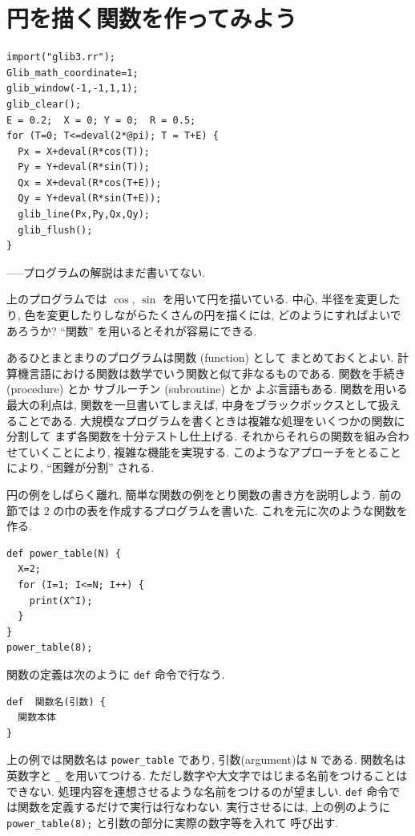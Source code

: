 \documentclass{jbook}
\begin{document}
\section{円を描く関数を作ってみよう}

\begin{screen}
\begin{verbatim}
import("glib3.rr");
Glib_math_coordinate=1;
glib_window(-1,-1,1,1);
glib_clear();
E = 0.2;  X = 0; Y = 0;  R = 0.5;
for (T=0; T<=deval(2*@pi); T = T+E) {
  Px = X+deval(R*cos(T));
  Py = Y+deval(R*sin(T));
  Qx = X+deval(R*cos(T+E));
  Qy = Y+deval(R*sin(T+E));
  glib_line(Px,Py,Qx,Qy);
  glib_flush(); 
}
\end{verbatim}
\end{screen}
-----プログラムの解説はまだ書いてない.

上のプログラムでは $\cos$, $\sin$ を用いて円を描いている.
中心, 半径を変更したり, 色を変更したりしながらたくさんの円を描くには,
どのようにすればよいであろうか?
``関数'' を用いるとそれが容易にできる.

あるひとまとまりのプログラムは関数 (function) として
まとめておくとよい.    
計算機言語における関数は数学でいう関数と似て非なるものである.
関数を手続き (procedure) とか サブルーチン (subroutine) とか
よぶ言語もある.
関数を用いる最大の利点は, 関数を一旦書いてしまえば,
中身をブラックボックスとして扱えることである.
大規模なプログラムを書くときは複雑な処理をいくつかの関数に分割して
まず各関数を十分テストし仕上げる.
それからそれらの関数を組み合わせていくことにより, 
複雑な機能を実現する.
このようなアプローチをとることにより, ``困難が分割'' される.

円の例をしばらく離れ,
簡単な関数の例をとり関数の書き方を説明しよう.
前の節では $2$ の巾の表を作成するプログラムを書いた.
これを元に次のような関数を作る.
\begin{screen}
\begin{verbatim}
def power_table(N) {
  X=2;
  for (I=1; I<=N; I++) {
    print(X^I);
  }
}
power_table(8);
\end{verbatim}
\end{screen}
関数の定義は次のように {\tt def} 命令で行なう.
\begin{verbatim}
def  関数名(引数) {
  関数本体 
}
\end{verbatim}
上の例では関数名は {\tt power\_table} であり, 引数(argument)は {\tt N} である.
関数名は英数字と {\tt \_} を用いてつける.
ただし数字や大文字ではじまる名前をつけることはできない.
処理内容を連想させるような名前をつけるのが望ましい.
{\tt def} 命令では関数を定義するだけで実行は行なわない.
実行させるには, 上の例のように {\tt power\_table(8);} と引数の部分に実際の数字等を入れて
呼び出す.
\end{document}
